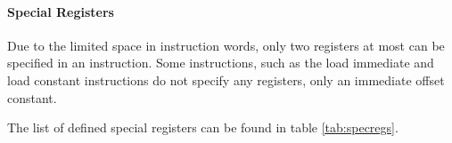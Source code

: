 
\FloatBarrier

\paragraph{Special Registers}

Due to the limited space in instruction words, only two registers at most can be
specified in an instruction. Some instructions, such as the load immediate and
load constant instructions do not specify any registers, only an immediate
offset constant.

The list of defined special registers can be found in table \ref{tab:specregs}.


\FloatBarrier
